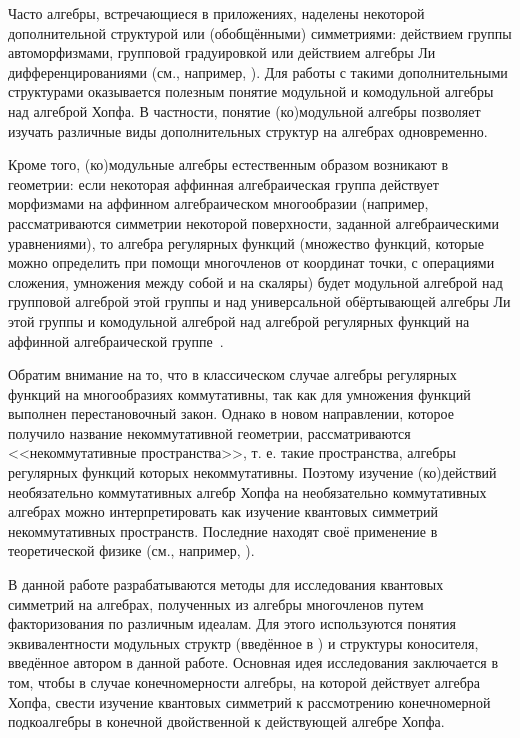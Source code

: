 \documentclass[12pt, reqno, a4paper, oneside, notitlepage]{amsart}
\theoremstyle{mytheoremstyle}
\theoremstyle{myremarkstyle}
\numberwithin{equation}{section}
\begin{document}
Часто алгебры, встречающиеся в приложениях, наделены некоторой дополнительной структурой или (обобщёнными) симметриями: действием группы автоморфизмами, групповой градуировкой или действием алгебры Ли дифференцированиями (см., например, \cite{PolyakovBook, HaagBook, KakuBook, MajidBook}). Для работы с такими дополнительными структурами оказывается полезным понятие модульной и комодульной алгебры над алгеброй Хопфа. В частности, понятие (ко)модульной алгебры позволяет изучать различные виды дополнительных структур на алгебрах одновременно.

Кроме того, (ко)модульные алгебры естественным образом возникают в геометрии: если некоторая аффинная алгебраическая группа действует морфизмами на аффинном алгебраическом многообразии (например, рассматриваются симметрии некоторой поверхности, заданной алгебраическими уравнениями), то алгебра регулярных функций (множество функций, которые можно определить при помощи многочленов от координат точки,
с операциями сложения, умножения между собой и на скаляры) будет модульной алгеброй над групповой алгеброй этой группы и над универсальной обёртывающей алгебры Ли этой группы и комодульной алгеброй над алгеброй регулярных функций на аффинной алгебраической группе~\cite{Abe}.

Обратим внимание на то, что в классическом случае алгебры регулярных функций на многообразиях коммутативны, так как для умножения функций выполнен перестановочный закон. Однако в новом направлении, которое получило название некоммутативной геометрии, рассматриваются <<некоммутативные пространства>>, т. е. такие пространства, алгебры регулярных функций которых некоммутативны. Поэтому изучение (ко)действий необязательно коммутативных алгебр Хопфа на необязательно коммутативных алгебрах можно интерпретировать как изучение квантовых симметрий некоммутативных пространств. Последние находят своё применение в теоретической физике (см., например, \cite{ConnesMarcolli, Donatsos}).

В данной работе разрабатываются методы для исследования квантовых симметрий на алгебрах, полученных из алгебры многочленов путем факторизования по различным идеалам. Для этого используются понятия эквивалентности модульных структр (введённое в \cite{ASGordienko21ALAgoreJVercruysse}) и структуры коносителя, введённое автором в данной работе. Основная идея исследования заключается в том, чтобы в случае конечномерности алгебры, на которой действует алгебра Хопфа, свести изучение квантовых симметрий к рассмотрению конечномерной подкоалгебры в конечной двойственной к действующей алгебре Хопфа.
\end{document}
